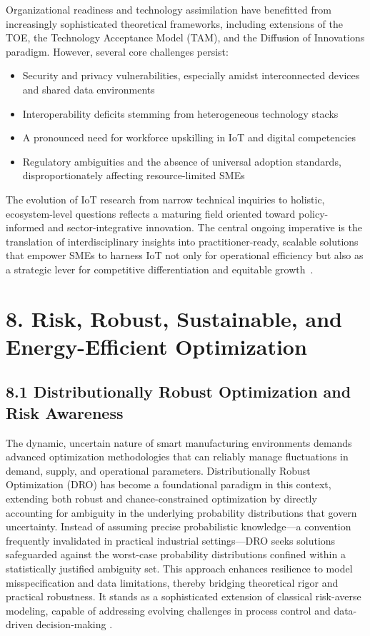 \documentclass[11pt]{article}
\begin{document}
Organizational readiness and technology assimilation have benefitted from increasingly sophisticated theoretical frameworks, including extensions of the TOE, the Technology Acceptance Model (TAM), and the Diffusion of Innovations paradigm. However, several core challenges persist:
\begin{itemize}
    \item Security and privacy vulnerabilities, especially amidst interconnected devices and shared data environments
    \item Interoperability deficits stemming from heterogeneous technology stacks
    \item A pronounced need for workforce upskilling in IoT and digital competencies
    \item Regulatory ambiguities and the absence of universal adoption standards, disproportionately affecting resource-limited SMEs
\end{itemize}

The evolution of IoT research from narrow technical inquiries to holistic, ecosystem-level questions reflects a maturing field oriented toward policy-informed and sector-integrative innovation. The central ongoing imperative is the translation of interdisciplinary insights into practitioner-ready, scalable solutions that empower SMEs to harness IoT not only for operational efficiency but also as a strategic lever for competitive differentiation and equitable growth~\cite{ref33}.

\section{8. Risk, Robust, Sustainable, and Energy-Efficient Optimization}

\subsection{8.1 Distributionally Robust Optimization and Risk Awareness}

The dynamic, uncertain nature of smart manufacturing environments demands advanced optimization methodologies that can reliably manage fluctuations in demand, supply, and operational parameters. Distributionally Robust Optimization (DRO) has become a foundational paradigm in this context, extending both robust and chance-constrained optimization by directly accounting for ambiguity in the underlying probability distributions that govern uncertainty. Instead of assuming precise probabilistic knowledge—a convention frequently invalidated in practical industrial settings—DRO seeks solutions safeguarded against the worst-case probability distributions confined within a statistically justified ambiguity set. This approach enhances resilience to model misspecification and data limitations, thereby bridging theoretical rigor and practical robustness. It stands as a sophisticated extension of classical risk-averse modeling, capable of addressing evolving challenges in process control and data-driven decision-making \cite{ref77}.
\end{document}
